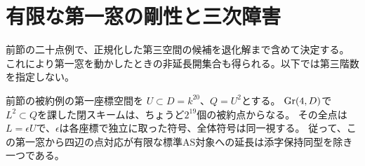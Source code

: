 \section{有限な第一窓の剛性と三次障害}
\label{sec:finite-window-rigidity}
前節の二十点例で、正規化した第三空間の候補を退化解まで含めて決定する。
これにより第一窓を動かしたときの非延長開集合も得られる。以下では第三階数を指定しない。

\begin{theorem}[二十点例の全平方根]\label{thm:finite-all-square-roots}
前節の被約例の第一座標空間を $U\subset D=k^{20}$、$Q=U^2$とする。
$\operatorname{Gr}(4,D)$で$L^2\subset Q$を課した閉スキームは、ちょうど$2^{19}$個の被約点からなる。
その全点は$L=\epsilon U$で、$\epsilon$は各座標で独立に取った符号、全体符号は同一視する。
従って、この第一窓から四辺の点対応が有限な標準AS対象への延長は添字保持同型を除き一つである。
\end{theorem}
